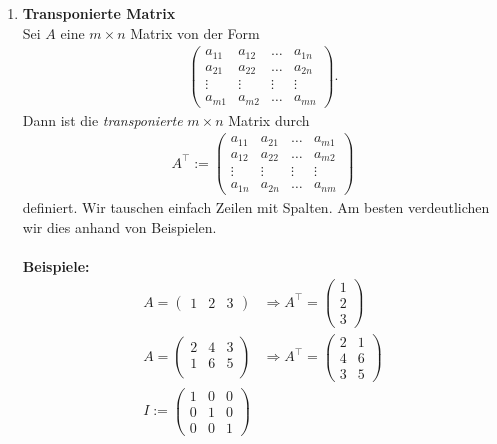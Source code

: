 \begin{enumerate}
\item \textbf{Transponierte Matrix}\vspace{0.2cm}\\
Sei $A$ eine $m \times n$ Matrix von der Form
\begin{align*}
\begin{pmatrix}
a_{11} & a_{12} & \dots & a_{1n}\\
a_{21} & a_{22} & \dots & a_{2n}\\
\vdots & \vdots & \vdots & \vdots\\
a_{m1} & a_{m2} & \hdots & a_{mn}
\end{pmatrix}.
\end{align*}
Dann ist die \textit{transponierte} $m \times n$ Matrix durch
\begin{align*}
A^\top
:=
\begin{pmatrix}
a_{11} & a_{21} & \dots & a_{m1}\\
a_{12} & a_{22} & \dots & a_{m2} \\
\vdots & \vdots & \vdots & \vdots\\
a_{1n} & a_{2n} & \dots & a_{nm}
\end{pmatrix}
\end{align*}
definiert.
Wir tauschen einfach Zeilen mit Spalten.
Am besten verdeutlichen wir dies anhand von Beispielen.\\
\\
\textbf{Beispiele:}
\begin{align*}
A = 
\begin{pmatrix}
1 & 2 & 3
\end{pmatrix}
&\Rightarrow
A^\top
= \begin{pmatrix}
1 \\ 2 \\ 3
\end{pmatrix}\\
A = 
\begin{pmatrix}
2 & 4 & 3\\
1 & 6 & 5\\
\end{pmatrix}
&\Rightarrow
A^\top
= 
\begin{pmatrix}
2 & 1 \\
4 & 6  \\
3 & 5
\end{pmatrix}\\
I := 
\begin{pmatrix}
1 & 0 & 0\\
0 & 1 & 0\\
0 & 0 & 1

\end{pmatrix}
\end{align*}
\end{enumerate}
